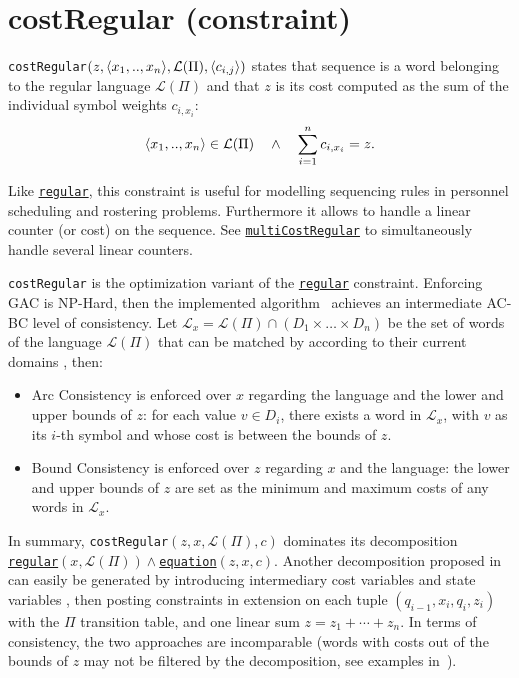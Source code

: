 \hypertarget{costregular}{}

\section{costRegular (constraint)}\label{costregular:costregularconstraint}\hypertarget{costregular:costregularconstraint}{}
\begin{notedef}
  \texttt{costRegular}$(z, \langle x_1,..,x_n\rangle,\mathcal{L}(\Pi), \langle c_{i,j}\rangle)$ states that sequence  is a word belonging to the regular language $\mathcal{L}(\Pi)$ and that $z$ is its cost computed as the sum of the individual symbol weights $c_{i,x_i}$:
$$ \langle x_1,..,x_n\rangle \in \mathcal{L}(\Pi)\quad\land\quad \sum_{i=1}^n c_{i,x_i} = z.$$
\end{notedef}

Like \hyperlink{regular}{\texttt{regular}}, this constraint is useful for modelling sequencing rules in personnel scheduling and rostering problems. Furthermore it allows to handle a linear counter (or cost) on the sequence. See \hyperlink{multicostregular}{\texttt{multiCostRegular}} to simultaneously handle several linear counters.

\texttt{costRegular} is the optimization variant of the \hyperlink{regular:regularconstraint}{\texttt{regular}} constraint. Enforcing GAC is NP-Hard, then the implemented algorithm~\cite{DemasseyC06} achieves an intermediate AC-BC level of consistency. Let $\mathcal{L}_x=\mathcal{L}(\Pi)\cap (D_1\times\ldots\times D_n)$ be the set of words of the language $\mathcal{L}(\Pi)$ that can be matched by  according to their current domains , then:  
      \begin{itemize}
      \item Arc Consistency is enforced over $x$ regarding the language and the lower and upper bounds of $z$: for each value $v\in D_i$, there exists a word in $\mathcal{L}_x$, with $v$ as its $i$-th symbol and whose cost is between the bounds of $z$.
      \item Bound Consistency is enforced over $z$ regarding $x$ and the language: the lower and upper bounds of $z$ are set as the minimum and maximum costs of any words in $\mathcal{L}_x$.
      \end{itemize}
In summary, \texttt{costRegular}$(z, x,\mathcal{L}(\Pi), c)$ dominates its decomposition \hyperlink{regular}{\texttt{regular}}$(x,\mathcal{L}(\Pi))\land$\hyperlink{equation}{\texttt{equation}}$(z, x, c)$. Another decomposition proposed in~\cite{BeldiceanuC05} can easily be generated by introducing intermediary cost variables  and state variables , then posting constraints in extension on each tuple $(q_{i-1},x_i,q_i,z_i)$ with the $\Pi$ transition table, and one linear sum $z=z_1+\cdots+z_n$. In terms of consistency, the two approaches are incomparable (words with costs out of the bounds of $z$ may not be filtered by the decomposition, see examples in~\cite{MenanaCPAIOR09}).  

